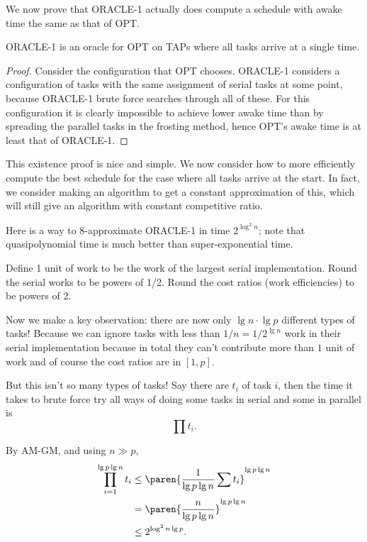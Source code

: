 We now prove that ORACLE-1 actually does compute a schedule with
awake time the same as that of OPT.
\begin{lemma}
  \label{lem:frosting} 
  ORACLE-1 is an oracle for OPT on TAPs where all tasks arrive at a single time.
\end{lemma}
\begin{proof}
  Consider the configuration that OPT chooses. ORACLE-1 considers
  a configuration of tasks with the same assignment of serial
  tasks at some point, because ORACLE-1 brute force searches
  through all of these. For this configuration it is clearly
  impossible to achieve lower awake time than by spreading the
  parallel tasks in the frosting method, hence OPT's awake time
  is at least that of ORACLE-1.
\end{proof}

This existence proof is nice and simple. We now consider how to
more efficiently compute the best schedule for the case where all
tasks arrive at the start. In fact, we consider making an
algorithm to get a constant approximation of this, which will
still give an algorithm with constant competitive ratio.

Here is a way to 8-approximate ORACLE-1 in time $2^{\log^2 n}$;
note that quasipolynomial time is much better than super-exponential time.

Define 1 unit of work to be the work of the largest serial
implementation.
Round the serial works to be powers of 1/2.
Round the cost ratios (work efficiencies) to be powers of 2. 

Now we make a key observation: there are now only 
$\lg n \cdot \lg p$ different types of tasks!
Because we can ignore tasks with less than $1/n = 1/2^{\lg n}$ work
in their serial implementation because in total they can't
contribute more than $1$ unit of work 
and of course the cost ratios are in $[1,p]$.

But this isn't so many types of tasks! Say there are $t_i$ of
task $i$, then the time it takes to brute force try all ways of
doing some tasks in serial and some in parallel is 
$$\prod t_i.$$

By AM-GM, and using $n \gg p$,
\begin{align*}
\prod_{i=1}^{\lg p \lg n} t_i &\le \paren{\frac{1}{\lg p \lg n} \sum t_i}^{\lg p \lg n} \\
&= \paren{\frac{n}{\lg p \lg n}}^{\lg p \lg n}\\
&\le 2^{\log^2 n \lg p}.
\end{align*}

